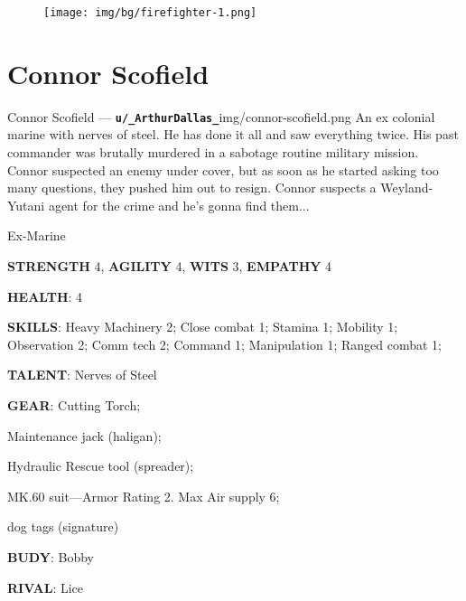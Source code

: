 


\begin{figure}
    \centering
    \texttt{[image: img/bg/firefighter-1.png]}
    \label{fig:refinery}
\end{figure}

\newsect

\clearpage


\section{Connor Scofield}

\begin{rpg-pcbox}{Connor Scofield --- \texttt{\textbf{u/\_ArthurDallas\_}}}{img/connor-scofield.png}
    An ex colonial marine with nerves of steel. He has done it all and saw everything twice. His past commander was brutally murdered in a sabotage routine military mission. Connor suspected an enemy under cover, but as soon as he started asking too many questions, they pushed him out to resign. Connor suspects a Weyland-Yutani agent for the crime and he's gonna find them...
    
\end{rpg-pcbox}

\begin{rpg-commentbox}{}
    Ex-Marine

    \textbf{STRENGTH} 4, \textbf{AGILITY} 4, \textbf{WITS} 3, \textbf{EMPATHY} 4

    \textbf{HEALTH}: 4

    \textbf{SKILLS}: Heavy Machinery 2; Close combat 1; Stamina 1; Mobility 1; Observation 2; Comm tech 2; Command 1; Manipulation 1; Ranged combat 1;
    
    \textbf{TALENT}: Nerves of Steel
    
    \textbf{GEAR}: Cutting Torch;
    
    Maintenance jack (haligan);
    
    Hydraulic Rescue tool (spreader);
    
    MK.60 suit---Armor Rating 2. Max Air supply 6;  
    
    dog tags (signature)
      
    \textbf{BUDY}: Bobby
    
    \textbf{RIVAL}: Lice
\end{rpg-commentbox}


